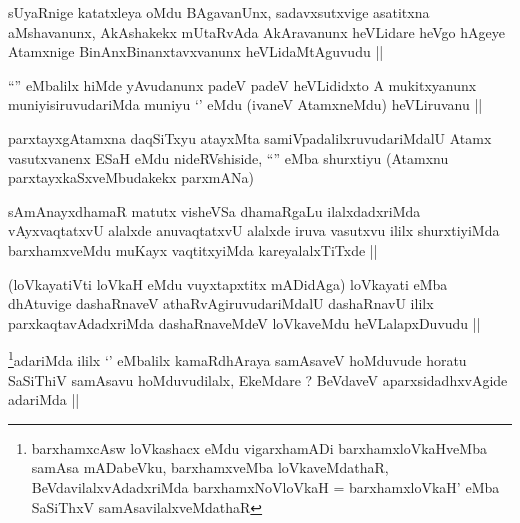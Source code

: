\begin{artha}
sUyaRnige katatxleya oMdu BAgavanUnx, sadavxsutxvige asatitxna
aMshavanunx, AkAshakekx mUtaRvAda AkAravanunx heVLidare heVgo hAgeye
Atamxnige BinAnxBinanxtavxvanunx heVLidaMtAguvudu ||
\end{artha}


\begin{artha}
``\stext'' eMbalilx hiMde yAvudanunx padeV padeV heVLididxto A
  mukitxyanunx muniyisiruvudariMda muniyu `\stext' eMdu (ivaneV
  AtamxneMdu) heVLiruvanu ||
\end{artha}

\begin{artha}
parxtayxgAtamxna daqSiTxyu atayxMta samiVpadalilxruvudariMdalU Atamx
vasutxvanenx ESaH eMdu nideRVshiside, ``\stext'' eMba shurxtiyu
(Atamxnu parxtayxkaSxveMbudakekx parxmANa)
\end{artha}



\begin{artha}
sAmAnayxdhamaR matutx visheVSa dhamaRgaLu ilalxdadxriMda vAyxvaqtatxvU
alalxde anuvaqtatxvU alalxde iruva vasutxvu ililx shurxtiyiMda
barxhamxveMdu muKayx vaqtitxyiMda kareyalalxTiTxde || 
\end{artha}


\begin{artha}
(loVkayatiVti loVkaH eMdu vuyxtapxtitx mADidAga) loVkayati eMba
  dhAtuvige dashaRnaveV athaRvAgiruvudariMdalU dashaRnavU ililx
  parxkaqtavAdadxriMda dashaRnaveMdeV loVkaveMdu heVLalapxDuvudu ||
\end{artha}

\begin{artha}
\footnote[1]{barxhamxcAsw loVkashacx eMdu vigarxhamADi
  barxhamxloVkaHveMba samAsa mADabeVku, barxhamxveMba loVkaveMdathaR,
  BeVdavilalxvAdadxriMda barxhamxNoVloVkaH = barxhamxloVkaH' eMba
  SaSiThxV samAsavilalxveMdathaR}adariMda ililx `\stext' eMbalilx kamaRdhAraya samAsaveV
hoMduvude horatu SaSiThiV samAsavu hoMduvudilalx, EkeMdare ? BeVdaveV
aparxsidadhxvAgide adariMda ||
\end{artha}


